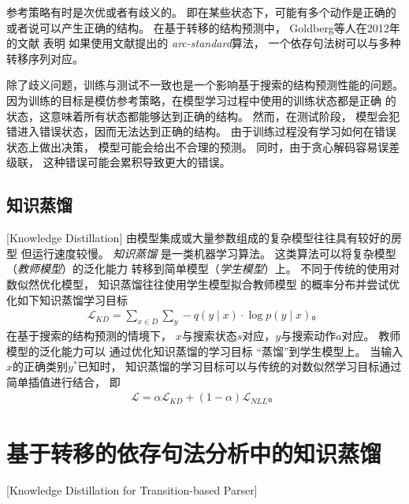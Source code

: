 参考策略有时是次优或者有歧义的。
即在某些状态下，可能有多个动作是正确的
或者说可以产生正确的结构。
在基于转移的结构预测中，
Goldberg等人在2012年的文献
表明
如果使用文献提出的
{\it arc-standard}算法，
一个依存句法树可以与多种转移序列对应。

除了歧义问题，训练与测试不一致也是一个影响基于搜索的结构预测性能的问题。
因为训练的目标是模仿参考策略，在模型学习过程中使用的训练状态都是正确
的状态，这意味着所有状态都能够达到正确的结构。
然而，在测试阶段，
模型会犯错进入错误状态，因而无法达到正确的结构。
由于训练过程没有学习如何在错误状态上做出决策，
模型可能会给出不合理的预测。
同时，由于贪心解码容易误差级联，
这种错误可能会累积导致更大的错误。

\subsection{知识蒸馏}[Knowledge Distillation]
由模型集成或大量参数组成的复杂模型往往具有较好的房型
但运行速度较慢。
\textit{知识蒸馏}\cite{Bucilua:2006:MC:1150402.1150464,NIPS2014_5484,DBLP:journals/corr/HintonVD15}
是一类机器学习算法。
这类算法可以将复杂模型（\textit{教师模型}）的泛化能力
转移到简单模型（\textit{学生模型}）上。
不同于传统的使用对数似然优化模型，
知识蒸馏往往使用学生模型拟合教师模型
的概率分布并尝试优化如下知识蒸馏学习目标
\begin{align}
\mathcal{L}_{KD} =  \sum_{x \in D} \sum_{y} -q(y
\mid x) \cdot \log p(y \mid x)\text{。}
\end{align}
在基于搜索的结构预测的情境下，
$x$与搜索状态$s$对应，$y$与搜索动作$a$对应。
教师模型的泛化能力可以
通过优化知识蒸馏的学习目标
``蒸馏''到学生模型上。
当输入$x$的正确类别$y^*$已知时，
知识蒸馏的学习目标可以与传统的对数似然学习目标通过简单插值进行结合，
即
\begin{align}\label{eq:distill:distill}
\mathcal{L} = \alpha \mathcal{L}_{KD} + (1 - \alpha) \mathcal{L}_{NLL}\text{。}
\end{align}

\section{基于转移的依存句法分析中的知识蒸馏}[Knowledge Distillation for Transition-based Parser]

